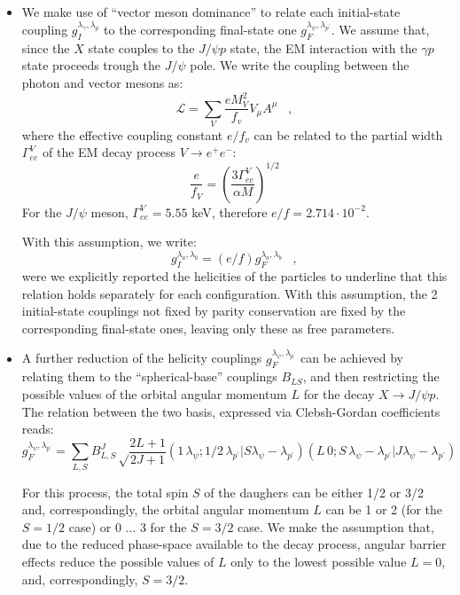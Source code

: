 \documentclass[a4paper,10pt]{article}
\begin{document}
\begin{itemize}
\item{We make use of ``vector meson dominance'' \cite{Bauer:1977iq} to relate each initial-state coupling  $g^{\lambda_\gamma,\lambda_p}_{I}$ to the corresponding final-state one $g^{\lambda_\psi,\lambda_{p^{\prime}}}_{F}$. We assume that, since the $X$ state couples to the $J/\psi p$ state, the EM interaction with the $\gamma p$ state proceeds trough the $J/\psi$ pole. We write the coupling between the photon and vector mesons as:
\begin{equation}
\mathcal{L}=\sum_V \frac{e M^2_V}{f_v} V_\mu A^{\mu} \; \; \; ,
\end{equation} 
where the effective coupling constant $e / f_v$ can be related to the partial width $\Gamma^V_{ee}$ of the EM decay process $V\rightarrow e^+ e^-$:
\begin{equation}
\frac{e}{f_V}=\left(\frac{3\Gamma^V_{ee}}{\alpha M}\right)^{1/2}
\end{equation}
}
For the $J/\psi$ meson, $\Gamma^V_{ee} = 5.55$ keV, therefore $e/f = 2.714\cdot 10^{-2}$.

With this assumption, we write:
\begin{equation}
g^{\lambda_a,\lambda_b}_{I}=(e/f) g^{\lambda_a,\lambda_b}_{F} \; \; \; ,
\end{equation}
were we explicitly reported the helicities of the particles to underline that this relation holds separately for each configuration. With this assumption, the 2 initial-state couplings not fixed by parity conservation are fixed by the corresponding final-state ones, leaving only these as free parameters.

\item{A further reduction of the helicity couplings $g^{\lambda_\psi,\lambda_{p^{\prime}}}_{F}$ can be achieved by relating them to the ``spherical-base'' couplings $B_{LS}$, and then restricting the possible values of the orbital angular momentum $L$ for the decay $X\rightarrow J/\psi p$. 
The relation between the two basis, expressed via Clebsh-Gordan coefficients reads:
\begin{equation}
g^{\lambda_\psi,\lambda_{p^{\prime}}}_{F} =\sum_{L,S} B^{J}_{L,S} \sqrt\frac{2L+1}{2J+1} (1 \, \lambda_\psi ; 1/2 \,  \lambda_{p^\prime} | S \lambda_\psi - \lambda_{p^{\prime}}) (L  \,0 ; S  \, \lambda_\psi - \lambda_{p^{\prime}} | J \lambda_\psi - \lambda_{p^{\prime}})
\end{equation}


For this process, the total spin $S$ of the daughers can be either 1/2 or 3/2 and, correspondingly, the orbital angular momentum $L$ can be 1 or 2 (for the $S=1/2$ case) or 0 $\ldots$ 3 for the $S=3/2$ case.
We make the assumption that, due to the reduced phase-space available to the decay process, angular barrier effects reduce the possible values of $L$ only to the lowest possible value $L=0$, and, correspondingly, $S=3/2$.

}
\end{itemize}
\end{document}
